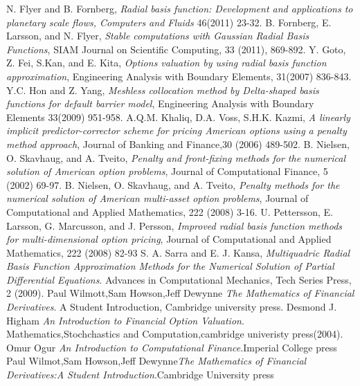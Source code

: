 \documentclass[12pt]{article}
\numberwithin{equation}{section} %
\begin{document}
\begin{thebiblio}{99}
N. Flyer and B. Fornberg,\emph{ Radial basis function: Development
and applications to planetary scale flows, Computers and Fluids}
46(2011) 23-32.
B. Fornberg, E. Larsson, and N. Flyer,\emph{ Stable computations
with Gaussian Radial Basis Functions}, SIAM Journal on Scientific
Computing, 33 (2011), 869-892.
Y. Goto, Z. Fei, S.Kan, and E. Kita, \emph{Options valuation by
using radial basis function approximation}, Engineering Analysis
with Boundary Elements, 31(2007) 836-843.
Y.C. Hon and Z. Yang, \emph{Meshless collocation method by
Delta-shaped basis functions for default barrier model}, Engineering
Analysis with Boundary Elements 33(2009) 951-958.
A.Q.M. Khaliq, D.A. Voss, S.H.K. Kazmi,   \emph{A linearly implicit
predictor-corrector scheme for pricing American options using a
penalty method approach}, Journal of Banking and Finance,30 (2006)
489-502.
B. Nielsen, O. Skavhaug, and A. Tveito, \emph{Penalty and
front-fixing methods for the numerical solution of American option
problems}, Journal of Computational Finance, 5 (2002) 69-97.
B. Nielsen, O. Skavhaug, and A. Tveito,\emph{ Penalty methods for
the numerical solution of American multi-asset option problems},
Journal of Computational and Applied Mathematics, 222 (2008) 3-16.
U.  Pettersson, E. Larsson, G.  Marcusson, and J. Persson,
\emph{Improved radial basis function methods for multi-dimensional
option pricing}, Journal of Computational and Applied Mathematics,
222 (2008) 82-93
S. A. Sarra and E. J. Kansa,  \emph{Multiquadric Radial Basis
Function Approximation Methods for the Numerical Solution of Partial
Differential Equations}. Advances in Computational Mechanics, Tech
Series Press, 2 (2009).
Paul Wilmott,Sam Howson,Jeff Dewynne  \emph{The Mathematics of
Financial Derivatives}. A Student Introduction, Cambridge university
press.
Desmond J. Higham  \emph{An Introduction to Financial Option
Valuation}. Mathematics,Stochchastics and Computation,cambridge
univeristy press(2004).
Omur Ogur \emph{An Introduction to Computational Finance}.Imperial
College press
Paul Wilmot,Sam Howson,Jeff Dewynne\emph{The Mathematics of
Financial Derivatives:A Student Introduction}.Cambridge University
press
\end{thebiblio}

\Appendixpage
\end{document}
